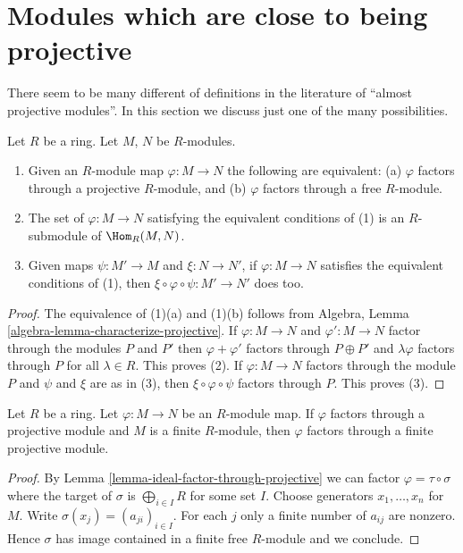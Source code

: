 \section{Modules which are close to being projective}
\label{section-near-projective}

\noindent
There seem to be many different of definitions in the literature of
``almost projective modules''. In this section we discuss just one
of the many possibilities.

\begin{lemma}
\label{lemma-ideal-factor-through-projective}
Let $R$ be a ring. Let $M$, $N$ be $R$-modules.
\begin{enumerate}
\item Given an $R$-module map $\varphi : M \to N$ the following are
equivalent: (a) $\varphi$ factors through a projective $R$-module, and
(b) $\varphi$ factors through a free $R$-module.
\item The set of $\varphi : M \to N$ satisfying the equivalent
conditions of (1) is an $R$-submodule of $\Hom_R(M, N)$.
\item Given maps $\psi : M' \to M$ and $\xi : N \to N'$, if
$\varphi : M \to N$ satisfies the equivalent conditions
of (1), then $\xi \circ \varphi \circ \psi : M' \to N'$ does too.
\end{enumerate}
\end{lemma}

\begin{proof}
The equivalence of (1)(a) and (1)(b) follows from
Algebra, Lemma \ref{algebra-lemma-characterize-projective}.
If $\varphi : M \to N$ and $\varphi' : M \to N$ factor through
the modules $P$ and $P'$ then $\varphi + \varphi'$
factors through $P \oplus P'$ and $\lambda \varphi$ factors through
$P$ for all $\lambda \in R$. This proves (2). If $\varphi : M \to N$
factors through the module $P$ and $\psi$ and $\xi$ are as in (3),
then $\xi \circ \varphi \circ \psi$ factors through $P$. This proves (3).
\end{proof}

\begin{lemma}
\label{lemma-factor-through-finite-projective}
Let $R$ be a ring. Let $\varphi : M \to N$ be an $R$-module map.
If $\varphi$ factors through a projective module and $M$ is a
finite $R$-module, then $\varphi$ factors through a finite projective
module.
\end{lemma}

\begin{proof}
By Lemma \ref{lemma-ideal-factor-through-projective} we can
factor $\varphi = \tau \circ \sigma$ where the target of $\sigma$
is $\bigoplus_{i \in I} R$ for some set $I$. Choose generators
$x_1, \ldots, x_n$ for $M$. Write $\sigma(x_j) = (a_{ji})_{i \in I}$.
For each $j$ only a finite number of $a_{ij}$ are nonzero.
Hence $\sigma$ has image contained in a finite free $R$-module
and we conclude.
\end{proof}

